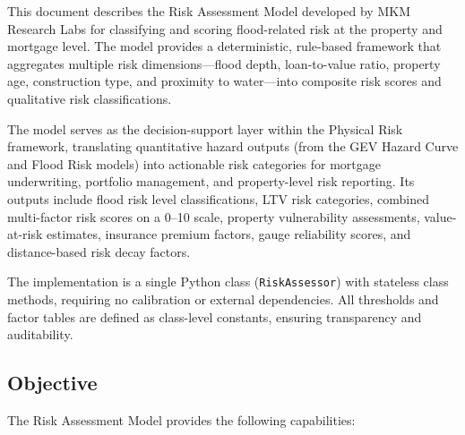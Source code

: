 \documentclass[11pt,a4paper]{article}
\begin{document}
\mkmtitlepage
\mkmlegalpage
\tableofcontents
\clearpage

\mkmexecsummary

This document describes the Risk Assessment Model developed by MKM Research Labs for classifying and scoring flood-related risk at the property and mortgage level. The model provides a deterministic, rule-based framework that aggregates multiple risk dimensions---flood depth, loan-to-value ratio, property age, construction type, and proximity to water---into composite risk scores and qualitative risk classifications.

The model serves as the decision-support layer within the Physical Risk framework, translating quantitative hazard outputs (from the GEV Hazard Curve and Flood Risk models) into actionable risk categories for mortgage underwriting, portfolio management, and property-level risk reporting. Its outputs include flood risk level classifications, LTV risk categories, combined multi-factor risk scores on a 0--10 scale, property vulnerability assessments, value-at-risk estimates, insurance premium factors, gauge reliability scores, and distance-based risk decay factors.

The implementation is a single Python class (\texttt{RiskAssessor}) with stateless class methods, requiring no calibration or external dependencies. All thresholds and factor tables are defined as class-level constants, ensuring transparency and auditability.

\clearpage

\mkmpurpose

\subsection{Objective}

The Risk Assessment Model provides the following capabilities:
\end{document}
